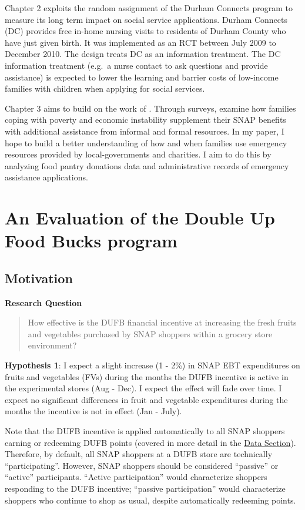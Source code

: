 \documentclass[12pt,letterpaperpaper,]{book}
\begin{document}
Chapter 2 exploits the random assignment of the Durham Connects program
to measure its long term impact on social service applications. Durham
Connects (DC) provides free in-home nursing visits to residents of
Durham County who have just given birth. It was implemented as an RCT
between July 2009 to December 2010. The design treats DC as an
information treatment. The DC information treatment (e.g.~a nurse
contact to ask questions and provide assistance) is expected to lower
the learning and barrier costs of low-income families with children when
applying for social services.

Chapter 3 aims to build on the work of
\citet{schenck-fontaine_use_2016}. Through surveys,
\citet{schenck-fontaine_use_2016} examine how families coping with
poverty and economic instability supplement their SNAP benefits with
additional assistance from informal and formal resources. In my paper, I
hope to build a better understanding of how and when families use
emergency resources provided by local-governments and charities. I aim
to do this by analyzing food pantry donations data and administrative
records of emergency assistance applications.

\chapter{An Evaluation of the Double Up Food Bucks
program}\label{chapter-1}

\section*{Motivation}\label{motivation}

\textbf{Research Question}

\begin{quote}
How effective is the DUFB financial incentive at increasing the fresh
fruits and vegetables purchased by SNAP shoppers within a grocery store
environment?
\end{quote}

\textbf{Hypothesis 1}: I expect a slight increase (1 - 2\%) in SNAP EBT
expenditures on fruits and vegetables (FVs) during the months the DUFB
incentive is active in the experimental stores (Aug - Dec). I expect the
effect will fade over time. I expect no significant differences in fruit
and vegetable expenditures during the months the incentive is not in
effect (Jan - July).

Note that the DUFB incentive is applied automatically to all SNAP
shoppers earning or redeeming DUFB points (covered in more detail in the
\protect\hyperlink{data-1}{Data Section}). Therefore, by default, all
SNAP shoppers at a DUFB store are technically ``participating''.
However, SNAP shoppers should be considered ``passive'' or ``active''
participants. ``Active participation'' would characterize shoppers
responding to the DUFB incentive; ``passive participation'' would
characterize shoppers who continue to shop as usual, despite
automatically redeeming points.
\end{document}
